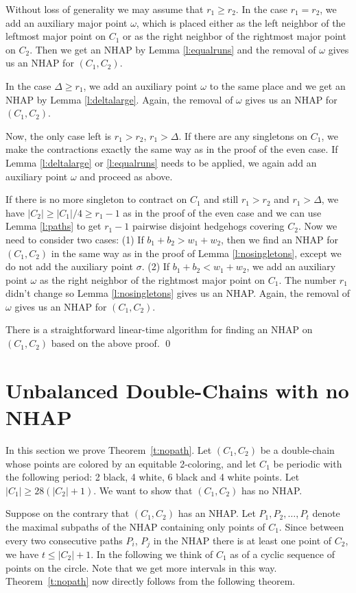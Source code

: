 \documentclass[12pt]{article}
\begin{document}
Without loss of generality we may assume that $r_1 \geq r_2$. In the case
$r_1=r_2$, we add an auxiliary major point $\omega$, which is placed either as
the left neighbor of the leftmost major point on
$C_1$ or as the right neighbor of the rightmost major point on $C_2$. Then
we get an NHAP by Lemma \ref{l:equalruns} and the removal of $\omega$ gives
us an NHAP for $(C_1, C_2)$. 

In the case $\Delta\ge r_1$, we add an auxiliary point $\omega$ to the same place
and we get an NHAP by Lemma \ref{l:deltalarge}. Again, the removal of
$\omega$ gives us an NHAP for $(C_1, C_2)$. 

Now, the only case left is $r_1>r_2$, $r_1>\Delta$.
If there are any singletons on $C_1$, we make the contractions exactly the same
way as in the proof of the even case. If Lemma \ref{l:deltalarge} or
\ref{l:equalruns} needs to be applied, we again add an auxiliary point
$\omega$ and proceed as above.

If there is no more singleton to contract on $C_1$ and still $r_1>r_2$ and
$r_1>\Delta$, we have $|C_2| \geq |C_1|/4 \geq r_1 -1$ as in the proof of
the even case and we can use Lemma
\ref{l:paths} to get $r_1-1$ pairwise disjoint hedgehogs covering $C_2$. Now we need to consider two cases: (1) If $b_1 + b_2 > w_1 + w_2$, then we find
an NHAP for $(C_1, C_2)$ in the same way as in the proof of Lemma
\ref{l:nosingletons}, except we do not add the auxiliary point $\sigma$.
(2) If $b_1 + b_2 < w_1 + w_2$, we add an auxiliary point $\omega$ as the
right neighbor of the rightmost major point on $C_1$. The number $r_1$ didn't
change so Lemma \ref{l:nosingletons} gives us an NHAP. Again, the removal
of $\omega$ gives us an NHAP for $(C_1, C_2)$.

There is a straightforward linear-time algorithm for finding an NHAP
on $(C_1,C_2)$ based on the above proof.
\qed


\section{Unbalanced Double-Chains with no NHAP}\label{s:nopath}
In this section we prove Theorem~\ref{t:nopath}.
Let $(C_1,C_2)$ be a double-chain whose points are colored by an equitable 2-coloring, and let $C_1$ be periodic with the following period: 2 black, 4 white, 6 black and 4 white points. 
Let $|C_1| \geq 28(|C_2|+1)$. We want to show that $(C_1,C_2)$ has no NHAP.

Suppose on the contrary that $(C_1,C_2)$ has an NHAP.
Let $P_1, P_2,\dots, P_t$ denote the maximal subpaths of the NHAP containing only points of $C_1$. Since between every two consecutive paths $P_i$, $P_j$ in the NHAP there is at least one point of $C_2$, we have $t\leq |C_2|+1$. In the following we think of $C_1$ as of a cyclic sequence of points on the circle. Note that we get more intervals in this way. Theorem~\ref{t:nopath} now directly follows from the following theorem.
\end{document}
